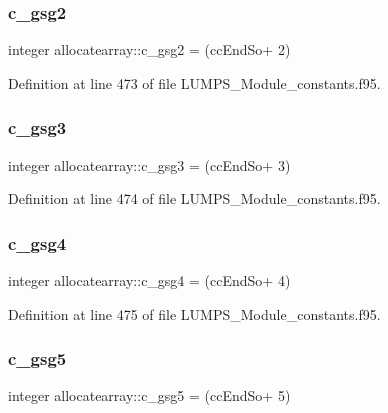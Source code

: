 \subsubsection{\texorpdfstring{c\+\_\+gsg2}{c\_gsg2}}
{\footnotesize\ttfamily integer allocatearray\+::c\+\_\+gsg2 = (cc\+End\+So+ 2)}



Definition at line 473 of file L\+U\+M\+P\+S\+\_\+\+Module\+\_\+constants.\+f95.

\mbox{\label{namespaceallocatearray_a70972d48cf32e2ae2f264134371657eb}} 
\subsubsection{\texorpdfstring{c\+\_\+gsg3}{c\_gsg3}}
{\footnotesize\ttfamily integer allocatearray\+::c\+\_\+gsg3 = (cc\+End\+So+ 3)}



Definition at line 474 of file L\+U\+M\+P\+S\+\_\+\+Module\+\_\+constants.\+f95.

\mbox{\label{namespaceallocatearray_ade39cdbf936049001075bb06589629d8}} 
\subsubsection{\texorpdfstring{c\+\_\+gsg4}{c\_gsg4}}
{\footnotesize\ttfamily integer allocatearray\+::c\+\_\+gsg4 = (cc\+End\+So+ 4)}



Definition at line 475 of file L\+U\+M\+P\+S\+\_\+\+Module\+\_\+constants.\+f95.

\mbox{\label{namespaceallocatearray_a1b25f9c9a9281958b7ed21d0bb85dde1}} 
\subsubsection{\texorpdfstring{c\+\_\+gsg5}{c\_gsg5}}
{\footnotesize\ttfamily integer allocatearray\+::c\+\_\+gsg5 = (cc\+End\+So+ 5)}



